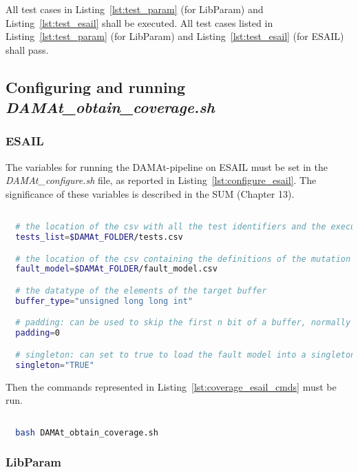   All test cases in Listing~\ref{lst:test_param} (for LibParam) and Listing~\ref{lst:test_esail} shall be executed.
  All test cases listed in Listing~\ref{lst:test_param} (for LibParam) and Listing~\ref{lst:test_esail} (for ESAIL) shall pass.

\subsection{Configuring and running \emph{DAMAt\_obtain\_coverage.sh}}

\subsubsection{ESAIL}

The variables for running the DAMAt-pipeline on ESAIL must be set in the \emph{DAMAt\_configure.sh} file, as reported in Listing~\ref{lst:configure_esail}. The significance of these variables is described in the SUM (Chapter 13).

  \begin{lstlisting}[language=bash, label={lst:configure_esail}]

  # the location of the csv with all the test identifiers and the execution time
  tests_list=$DAMAt_FOLDER/tests.csv

  # the location of the csv containing the definitions of the mutation operators
  fault_model=$DAMAt_FOLDER/fault_model.csv

  # the datatype of the elements of the target buffer
  buffer_type="unsigned long long int"

  # padding: can be used to skip the first n bit of a buffer, normally set to 0
  padding=0

  # singleton: can set to true to load the fault model into a singleton   variable, normally set to "TRUE", can also  be set to "FALSE"
  singleton="TRUE"

  \end{lstlisting}

Then the commands represented in Listing~\ref{lst:coverage_esail_cmds} must be run.

  \begin{lstlisting}[language=bash, label={lst:coverage_esail_cmds}]

  bash DAMAt_obtain_coverage.sh

  \end{lstlisting}

\subsubsection{LibParam}


